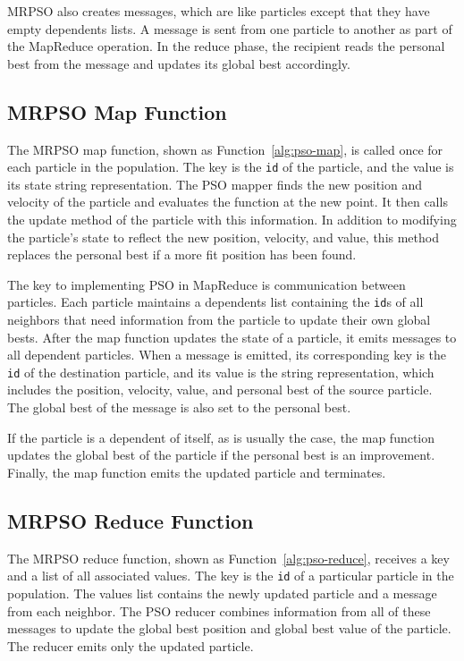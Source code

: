 \documentclass[letterpaper]{sig-alternate}
\begin{document}
MRPSO also creates messages, which are like particles except that they have
empty dependents lists.  A message is sent from one particle to another as
part of the MapReduce operation.  In the reduce phase, the recipient reads the
personal best from the message and updates its global best accordingly.

\subsection{MRPSO Map Function}

The MRPSO map function, shown as Function~\ref{alg:pso-map}, is called once
for each particle in the population.  The key is the \verb$id$ of the
particle, and the value is its state string representation.  The PSO mapper
finds the new position and velocity of the particle and evaluates the function
at the new point.  It then calls the update method of the particle with this
information.  In addition to modifying the particle's state to reflect the new
position, velocity, and value, this method replaces the personal best if a
more fit position has been found.

The key to implementing PSO in MapReduce is communication between particles.
Each particle maintains a dependents list containing the \verb$id$s of all
neighbors that need information from the particle to update their own global
bests.  After the map function updates the state of a particle, it emits
messages to all dependent particles.  When a message is emitted, its
corresponding key is the \verb$id$ of the destination particle, and its value
is the string representation, which includes the position, velocity, value,
and personal best of the source particle.  The global best of the message is
also set to the personal best.

If the particle is a dependent of itself, as is usually the case, the map
function updates the global best of the particle if the personal best is an
improvement.  Finally, the map function emits the updated
particle and terminates.

\subsection{MRPSO Reduce Function}

The MRPSO reduce function, shown as Function~\ref{alg:pso-reduce}, receives a
key and a list of all associated values.  The key is the \verb$id$ of a
particular particle in the population.  The values list contains the newly
updated particle and a message from each neighbor.  The PSO reducer combines
information from all of these messages to update the global best position and
global best value of the particle.  The reducer emits only the updated
particle.
\end{document}
